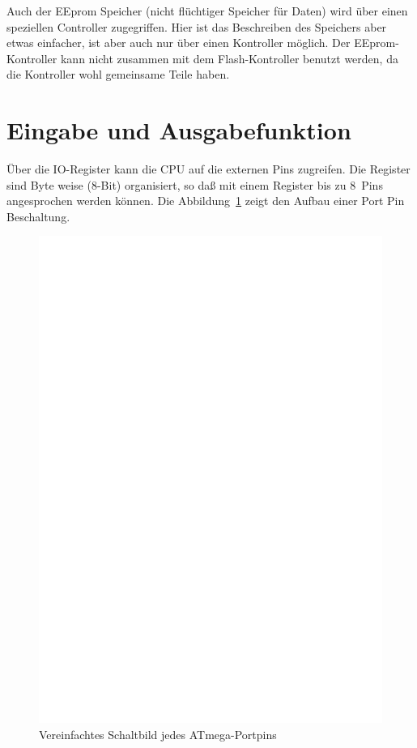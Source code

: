 Auch der EEprom Speicher (nicht flüchtiger Speicher für Daten) wird über
einen speziellen Controller zugegriffen. Hier ist das Beschreiben des Speichers
aber etwas einfacher, ist aber auch nur über einen Kontroller möglich.
Der EEprom-Kontroller kann nicht zusammen mit dem Flash-Kontroller benutzt werden,
da die Kontroller wohl gemeinsame Teile haben.

\section{Eingabe und Ausgabefunktion}

Über die IO-Register kann die CPU auf die externen Pins zugreifen. Die Register
sind Byte weise (8-Bit) organisiert, so daß mit einem Register bis zu 8~Pins
angesprochen werden können. Die Abbildung~\ref{fig:port} zeigt den 
Aufbau einer Port Pin Beschaltung.

\begin{figure}[H]
\centering
\includegraphics[]{../FIG/port.eps}
\caption{Vereinfachtes Schaltbild jedes ATmega-Portpins}
\label{fig:port}
\end{figure}

